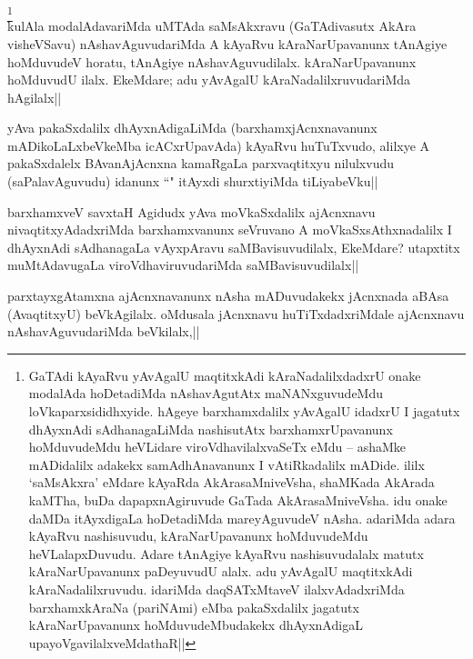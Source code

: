 \begin{artha} 
\footnote[1]{GaTAdi kAyaRvu yAvAgalU maqtitxkAdi kAraNadalilxdadxrU 
onake modalAda hoDetadiMda nAshavAgutAtx maNANxguvudeMdu 
loVkaparxsididhxyide. hAgeye barxhamxdalilx yAvAgalU idadxrU I 
jagatutx dhAyxnAdi sAdhanagaLiMda nashisutAtx barxhamxrUpavanunx 
hoMduvudeMdu heVLidare viroVdhavilalxvaSeTx eMdu -- ashaMke mADidalilx 
adakekx samAdhAnavanunx I vAtiRkadalilx mADide. ililx `saMsAkxra' 
eMdare kAyaRda AkArasaMniveVsha, shaMKada AkArada kaMTha, buDa 
dapapxnAgiruvude GaTada AkArasaMniveVsha. idu onake daMDa itAyxdigaLa 
hoDetadiMda mareyAguvudeV nAsha. adariMda adara kAyaRvu nashisuvudu, 
kAraNarUpavanunx hoMduvudeMdu heVLalapxDuvudu. Adare tAnAgiye kAyaRvu 
nashisuvudalalx matutx kAraNarUpavanunx paDeyuvudU alalx. adu yAvAgalU 
maqtitxkAdi kAraNadalilxruvudu. idariMda daqSATxMtaveV 
ilalxvAdadxriMda barxhamxkAraNa (pariNAmi) eMba pakaSxdalilx jagatutx 
kAraNarUpavanunx hoMduvudeMbudakekx dhAyxnAdigaL 
upayoVgavilalxveMdathaR||}\\
kulAla modalAdavariMda uMTAda saMsAkxravu (GaTAdivasutx AkAra 
visheVSavu) nAshavAguvudariMda A kAyaRvu kAraNarUpavanunx tAnAgiye 
hoMduvudeV horatu, tAnAgiye nAshavAguvudilalx. kAraNarUpavanunx 
hoMduvudU ilalx. EkeMdare; adu yAvAgalU kAraNadalilxruvudariMda 
hAgilalx||
\end{artha}


\begin{artha} 
yAva pakaSxdalilx dhAyxnAdigaLiMda (barxhamxjAcnxnavanunx 
mADikoLaLxbeVkeMba icACxrUpavAda) kAyaRvu huTuTxvudo, alilxye A 
pakaSxdalelx BAvanAjAcnxna kamaRgaLa parxvaqtitxyu nilulxvudu 
(saPalavAguvudu) idanunx ``\stext" itAyxdi shurxtiyiMda tiLiyabeVku||
\end{artha}


\begin{artha} 
barxhamxveV savxtaH Agidudx yAva moVkaSxdalilx ajAcnxnavu 
nivaqtitxyAdadxriMda barxhamxvanunx seVruvano A moVkaSxsAthxnadalilx I 
dhAyxnAdi sAdhanagaLa vAyxpAravu saMBavisuvudilalx, EkeMdare? 
utapxtitx muMtAdavugaLa viroVdhaviruvudariMda saMBavisuvudilalx||
\end{artha}


\begin{artha} 
parxtayxgAtamxna ajAcnxnavanunx nAsha mADuvudakekx jAcnxnada aBAsa 
(AvaqtitxyU) beVkAgilalx. oMdusala jAcnxnavu huTiTxdadxriMdale 
ajAcnxnavu nAshavAguvudariMda beVkilalx,||
\end{artha}

